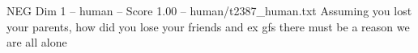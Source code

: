 \begin{textsample}{NEG Dim 1 – human – Score 1.00 – human/t2387\_human.txt}  \label{ex:f1_neg_020}
Assuming you lost your parents, how did you lose your friends and ex gfs there must be a reason we are all alone

\end{textsample}
